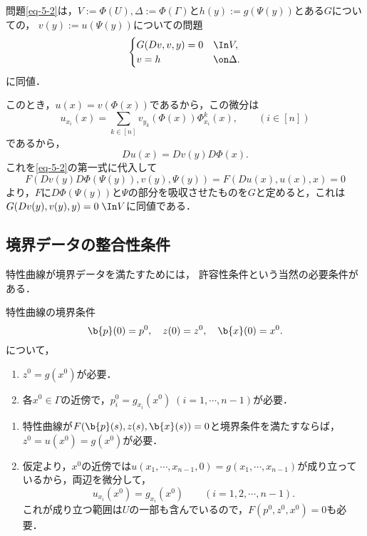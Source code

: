 \documentclass[uplatex,dvipdfmx]{jsreport}
\begin{document}
\begin{proposition}[変数変換は問題の構造を変えない]
    問題\ref{eq-5-2}は，$V:=\Phi(U),\Delta:=\Phi(\Gamma)$と$h(y):=g(\Psi(y))$とある$G$についての，
    $v(y):=u(\Psi(y))$についての問題
    \[\begin{cases}
        G(Dv,v,y)=0&\In V,\\
        v=h&\on\Delta.
    \end{cases}\]
    に同値．
\end{proposition}
\begin{Proof}
    このとき，$u(x)=v(\Phi(x))$であるから，この微分は
    \[u_{x_i}(x)=\sum_{k\in[n]}v_{y_k}(\Phi(x))\Phi^k_{x_i}(x),\qquad(i\in[n])\]
    であるから，
    \[Du(x)=Dv(y)D\Phi(x).\]
    これを\ref{eq-5-2}の第一式に代入して
    \[F(Dv(y)D\Phi(\Psi(y)),v(y),\Psi(y))=F(Du(x),u(x),x)=0\]
    より，$F$に$D\Phi(\Psi(y))$と$\Psi$の部分を吸収させたものを$G$と定めると，これは$G(Dv(y),v(y),y)=0\;\In V$に同値である．
\end{Proof}

\subsection{境界データの整合性条件}

\begin{tcolorbox}[colframe=ForestGreen, colback=ForestGreen!10!white,breakable,colbacktitle=ForestGreen!40!white,coltitle=black,fonttitle=\bfseries\sffamily,
title=]
    特性曲線が境界データを満たすためには，
    許容性条件という当然の必要条件がある．
\end{tcolorbox}

\begin{discussion}
    特性曲線の境界条件
    \[\b{p}(0)=p^0,\quad z(0)=z^0,\quad \b{x}(0)=x^0.\]
    について，
    \begin{enumerate}
        \item $z^0=g(x^0)$が必要．
        \item 各$x^0\in\Gamma$の近傍で，$p^0_i=g_{x_i}(x^0)\;(i=1,\cdots,n-1)$が必要．
    \end{enumerate}
\end{discussion}
\begin{Proof}\mbox{}
    \begin{enumerate}
        \item 特性曲線が$F(\b{p}(s),z(s),\b{x}(s))=0$と境界条件を満たすならば，$z^0=u(x^0)=g(x^0)$が必要．
        \item 仮定より，$x^0$の近傍では$u(x_1,\cdots,x_{n-1},0)=g(x_1,\cdots,x_{n-1})$が成り立っているから，両辺を微分して，
        \[u_{x_i}(x^0)=g_{x_i}(x^0)\qquad(i=1,2,\cdots,n-1).\]
        これが成り立つ範囲は$U$の一部も含んでいるので，$F(p^0,z^0,x^0)=0$も必要．
    \end{enumerate}
\end{Proof}
\end{document}
